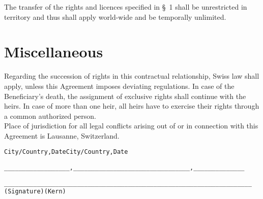 \A The transfer of the rights and licences specified in {\S}~1 shall
be unrestricted in territory and thus shall apply world-wide and be
temporally unlimited.

\section{Miscellaneous}
\A Regarding the succession of rights in this contractual
relationship, Swiss law shall apply, unless this Agreement imposes
deviating regulations. In case of the Beneficiary's death, the
assignment of exclusive rights shall continue with the heirs. In case
of more than one heir, all heirs have to exercise their rights through
a common authorized person.\\

\A Place of jurisdiction for all legal conflicts arising out of or in
connection with this Agreement is Lausanne, Switzerland.\\

\enlargethispage{2cm}
\vspace{1cm}
\begin{alltt}

City/Country,           Date             City/Country,          Date




__________________, ______________    __________________, ______________




__________________________________    __________________________________
          (Signature)                             (Kern)

\end{alltt}




